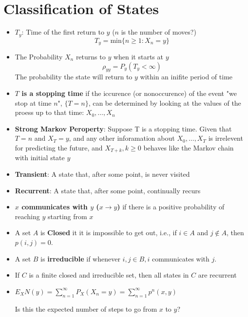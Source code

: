 \documentclass{report}
\begin{document}
\section{Classification of States}
  \begin{itemize}
    \item $T_y$: Time of the first return to $y$ ($n$ is the number of moves?)
      \[ T_y = \text{min}\{n \geq 1 : X_n = y\} \]
    \item The Probability $X_n$ returns to $y$ when it starts at $y$
      \[ \rho_{yy} = P_y(T_y < \infty) \]
      The probability the state will return to $y$ within an inifite period of time
      \item \textbf{$T$ is a stopping time} if the iccurence (or nonoccurence) 
        of the event "we stop at time $n$", $\{T = n\}$, can be determined
        by looking at the values of the proess up to that time: $X_0, \dots, X_n$

      \item \textbf{Strong Markov Peroperty}: Suppose T is a stopping time.
        Given that $T=n$ and $X_T = y$, and any other inforamation about
        $X_0,\dots,X_T$ is irrelevent for predicting the future, and $X_{T+k},
        k \geq 0$ behaves like the Markov chain with initial state $y$

      \item \textbf{Transient}: A state that, after some point, is never visited
      \item \textbf{Recurrent}: A state that, after some point, continually recurs
      \item \textbf{$x$ communicates with $y$ ($x \rightarrow y$)} if there is a
        positive probability of reaching $y$ starting from $x$
      \item  A set $A$ is  \textbf{Closed} it it is impossible to get out, 
        i.e., if $i \in A$ and $j \notin A$, then $p(i,j) = 0$.
      \item A set $B$ is \textbf{irreducible} if whenever $i, j \in B, i$
        communicates with $j$.
      \item If $C$ is a finite closed and irreducible set, then all states
        in $C$ are recurrent

        \item $E_XN(y)=\sum^{\infty}_{n=1}P_X(X_n=y) = \sum^{\infty}_{n=1}p^n(x,y)$

          Is this the expected number of steps to go from $x$ to $y$?
  \end{itemize}
\end{document}
